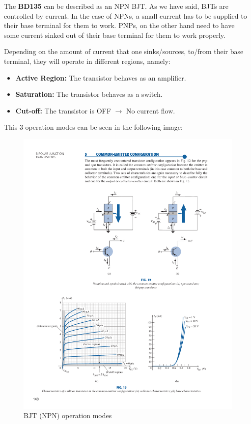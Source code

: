 The \textbf{BD135} can be described as an NPN BJT. As we have said, BJTs are controlled by current. In the case of NPNs, a small current has to be supplied to their base terminal for them to work. PNPs, on the other hand need to have some current sinked out of their base terminal for them to work properly.\medskip

\clearpage

Depending on the amount of current that one sinks/sources, to/from their base terminal, they will operate in different regions, namely:

\begin{itemize}
    \item \textbf{Active Region:} The transistor behaves as an amplifier. 
    \item \textbf{Saturation:} The transistor behaves as a switch.
    \item \textbf{Cut-off:} The transistor is OFF $\rightarrow$ No current flow.
\end{itemize}

This 3 operation modes can be seen in the following image:

\begin{figure}[H]
    \centering
    \includegraphics[width = \textwidth]{Graphics/VHDL/Practice 8/BJT/IC_VCE.pdf}
    \caption{BJT (NPN) operation modes~\autocite{BOYLESTAD}}
    \label{fig:BJT_MODES}
\end{figure}


